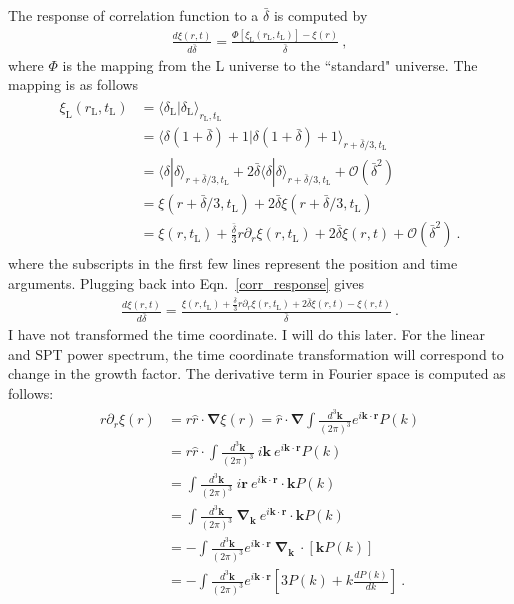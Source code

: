 The response of correlation function to a $\bar{\delta}$ is computed by 
\begin{align} 
\label{corr_response}
\frac{d \xi(r,t)}{d \bar{\delta}}= \frac{ \Phi[ \xi_\text{L}(r_\text{L},t_\text{L})]- \xi(r)}{\bar{\delta} } ~,
\end{align} 
where $\Phi$ is the mapping from the L universe to the ``standard" universe. The mapping is as follows 
 \begin{align} 
\begin{split} 
\xi_\text{L}(r_\text{L}, t_\text{L}) &= \langle \delta_\text{L} | \delta_\text{L} \rangle_{r_\text{L},t_\text{L}} \\
& =  \langle \delta (1+ \bar{\delta} ) + 1 | \delta(1+ \bar{\delta} ) + 1  \rangle_{r + \bar{\delta}/3,t_\text{L}} \\
& = \langle \delta | \delta \rangle_{r + \bar{\delta}/3,t_\text{L}} + 2 \bar{\delta} \langle \delta | \delta \rangle_{r + \bar{\delta}/3,t_\text{L} }+ \mathcal{O}(\bar{\delta}^2) \\
& = \xi(r + \bar{\delta}/3,t_\text{L}) + 2 \bar{\delta}\xi(r + \bar{\delta}/3,t_\text{L})  \\
& = \xi(r, t_\text{L}) + \frac{ \bar{\delta} }{3}r \partial_r \xi(r,t_\text{L}) + 2 \bar{\delta} \xi(r, t) + \mathcal{O}(\bar{\delta}^2) ~.
\end{split} 
\end{align} 
where the subscripts in the first few lines represent the position and time arguments. Plugging back into Eqn.~\ref{corr_response} gives 
\begin{align}  
\frac{d \xi(r,t)}{d \bar{\delta}} =\frac{ \xi(r, t_\text{L}) + \frac{ \bar{\delta} }{3}r \partial_r \xi(r,t_\text{L}) + 2 \bar{\delta} \xi(r, t) - \xi(r,t)}{\bar{\delta}} ~. 
\end{align} 
I have not transformed the time coordinate. I will do this later. For the linear and SPT power spectrum, the time coordinate transformation will correspond to change in the growth factor. 
The derivative term in Fourier space is computed as follows:
\begin{align} 
\begin{split} 
r \partial_r \xi(r) & =r\hat{r} \cdot \mathbf{\nabla} \xi(r) = \hat{r} \cdot  \mathbf{\nabla}  \int \frac{d^3 \mathbf{k}}{(2 \pi)^3} e^{i \mathbf{k} \cdot \mathbf{r} } P(k) \\
& = r\hat{r} \cdot \int \frac{d^3 \mathbf{k}}{(2 \pi)^3} ~i \mathbf{k}~ e^{i \mathbf{k} \cdot \mathbf{r} } P(k) \\
& = \int \frac{d^3 \mathbf{k}}{(2 \pi)^3} ~i \mathbf{r}~ e^{i \mathbf{k} \cdot \mathbf{r} } \cdot \mathbf{k}P(k) \\
& = \int \frac{d^3 \mathbf{k}}{(2 \pi)^3} ~\mathbf{\nabla}_\mathbf{k}~ e^{i \mathbf{k} \cdot \mathbf{r} } \cdot \mathbf{k}P(k) \\
& =- \int \frac{d^3 \mathbf{k}}{(2 \pi)^3} e^{i \mathbf{k} \cdot \mathbf{r} }   ~\mathbf{\nabla}_\mathbf{k}~\cdot [\mathbf{k}P(k) ]\\
& =- \int \frac{d^3 \mathbf{k}}{(2 \pi)^3} e^{i \mathbf{k} \cdot \mathbf{r} }  [ 3 P(k) + k \frac{d P(k)}{d k}] ~.
\end{split} 
\end{align} 
